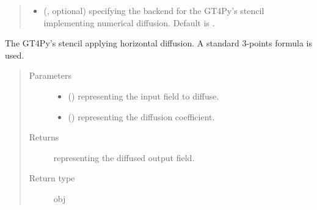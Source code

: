 \documentclass[letterpaper,10pt,english]{sphinxmanual}
\begin{document}
\begin{fulllineitems}
\begin{fulllineitems}
\begin{quote}
\begin{description}
\begin{itemize}
\item {} 
 (, optional) \textendash{}  specifying the backend for the GT4Py’s stencil implementing numerical
diffusion. Default is .

\end{itemize}

\end{description}\end{quote}

\end{fulllineitems}


\begin{fulllineitems}
\label{\detokenize{api:dycore.diffusion.DiffusionXZ._defs_stencil}}
The GT4Py’s stencil applying horizontal diffusion. A standard 3-points formula is used.
\begin{quote}\begin{description}
\item[{Parameters}] \leavevmode\begin{itemize}
\item {} 
 () \textendash{}  representing the input field to diffuse.

\item {} 
 () \textendash{}  representing the diffusion coefficient.

\end{itemize}

\item[{Returns}] \leavevmode
{} representing the diffused output field.

\item[{Return type}] \leavevmode
obj

\end{description}\end{quote}

\end{fulllineitems}



\end{fulllineitems}
\end{document}
